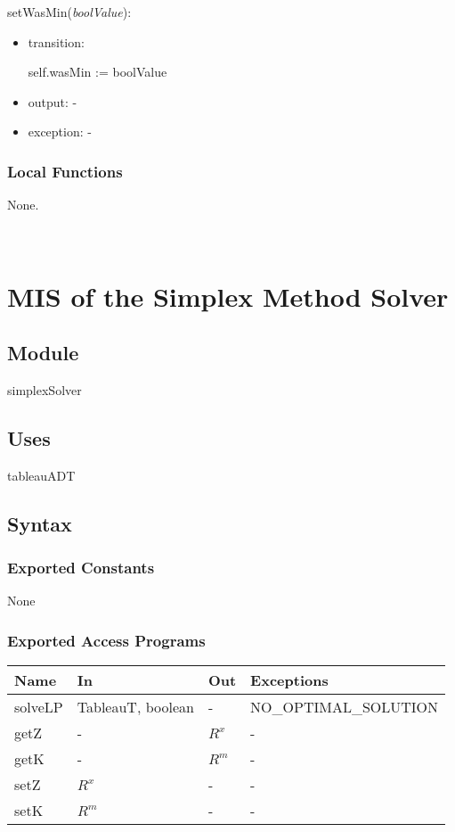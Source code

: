 \documentclass[12pt, titlepage]{article}
\begin{document}
\noindent 
setWasMin(\textit{boolValue}):
\begin{itemize}
	\item transition: 
	
	self.wasMin := boolValue
	\item output: -
	\item exception: -
\end{itemize}

\subsubsection{Local Functions}

None.

~\newpage

\section{MIS of the Simplex Method Solver} \label{M_simplexSolver} 

\subsection{Module}

simplexSolver

\subsection{Uses}

tableauADT

\subsection{Syntax}

\subsubsection{Exported Constants}

None

\subsubsection{Exported Access Programs}

\begin{center}
	\begin{tabular}{p{2cm} p{4cm} p{3cm} p{5cm}}
		\hline
		\textbf{Name} & \textbf{In} & \textbf{Out} & \textbf{Exceptions} \\
		\hline
		solveLP & TableauT, boolean & - & NO\_OPTIMAL\_SOLUTION \\
		getZ & - & $R^x$ & - \\
		getK & - & $R^m$ & - \\
		setZ & $R^x$ & - & - \\
		setK & $R^m$ & - & - \\
		\hline
	\end{tabular}
\end{center}
\end{document}
